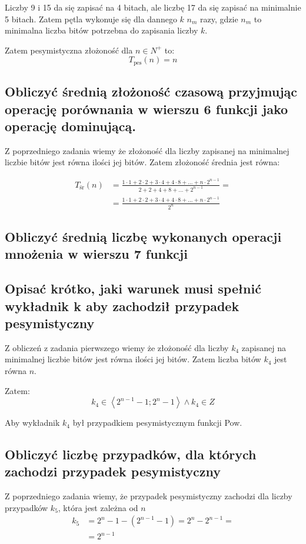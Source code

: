 \documentclass[a4paper,12pt]{article}
\begin{document}
Liczby 9 i 15 da się zapisać na 4 bitach, ale liczbę 17 da się zapisać na minimalnie 5 bitach. Zatem pętla wykonuje
się dla dannego $k$ $n_m$ razy, gdzie $n_m$ to minimalna liczba bitów potrzebna do zapisania liczby $k$. 

Zatem pesymistyczna złożoność dla $n \in N^+$ to:
\[T_\text{pes}(n) = n\]

\subsection{Obliczyć średnią złożoność czasową przyjmując operację porównania w wierszu 6
funkcji jako operację dominującą.}

Z poprzedniego zadania wiemy że złożoność dla liczby zapisanej na minimalnej liczbie bitów jest
równa ilości jej bitów. Zatem złożoność średnia jest równa:

\begin{align*}
 T_\text{śr}(n) &= \frac{1 \cdot 1 + 2\cdot2 + 3 \cdot 4 + 4 \cdot 8 + \dots + n\cdot2^{n -  1}}{2 + 2 + 4 + 8 + \dots +
 2^{n - 1}} = \\
 &= \frac{1 \cdot 1 + 2\cdot2 + 3 \cdot 4 + 4 \cdot 8 + \dots + n\cdot2^{n -  1}}{2^n}
\end{align*}

\subsection{Obliczyć średnią liczbę wykonanych operacji mnożenia w wierszu 7 funkcji}

\subsection{Opisać  krótko,  jaki  warunek  musi  spełnić  wykładnik k aby  zachodził  przypadek pesymistyczny}

Z obliczeń z zadania pierwszego wiemy że złożoność dla liczby $k_4$ zapisanej na minimalnej liczbie bitów jest
równa ilości jej bitów. Zatem liczba bitów $k_4$ jest równa $n$.

Zatem:
\[ k_4 \in \left\langle 2^{n-1} - 1; 2^n - 1 \right\rangle \wedge k_4 \in Z\]

Aby wykładnik $k_4$ był przypadkiem pesymistycznym funkcji Pow.

\subsection{Obliczyć liczbę przypadków, dla których zachodzi przypadek pesymistyczny}

Z poprzedniego zadania wiemy, że przypadek pesymistyczny zachodzi dla liczby przypadków $k_5$,
która jest zależna od $n$
\begin{align*}
		k_5 &= 2^n - 1 - \left( 2^{n-1} - 1 \right) = 2^n - 2^{n- 1} = \\
		&= 2^{n-1}
\end{align*}
\end{document}
